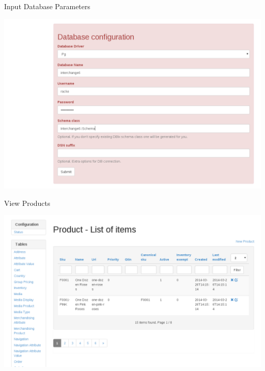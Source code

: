 \begin{frame}{Input Database Parameters}
  \begin{center}
    \includegraphics[width=\textwidth,height=0.8\textheight,keepaspectratio]{images/input.png}
  \end{center}
\end{frame}

\begin{frame}{View Products}
  \begin{center}
    \includegraphics[width=\textwidth,height=0.8\textheight,keepaspectratio]{images/product.png}
  \end{center}
\end{frame}

